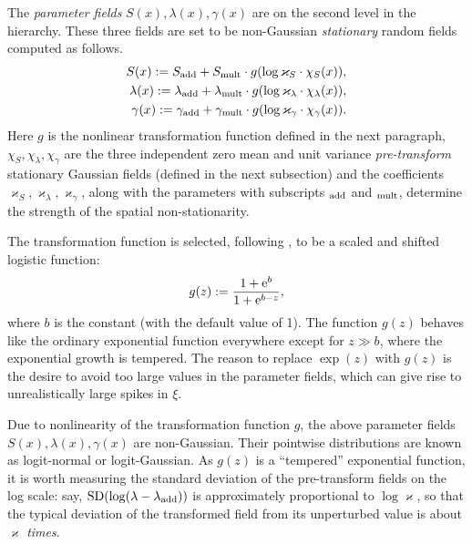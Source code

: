 \documentclass[12pt]{article}
\DeclareMathOperator{\sd}{SD}
\newcommand{\e}{\mathrm{e}}
\begin{document}
The {\em parameter fields}  $S(x),\lambda(x),\gamma(x)$ are on the second level in the hierarchy. 
These three fields are set to be 
non-Gaussian {\em stationary} random fields computed as follows.
%
\begin {equation}
\label{cnx}
\begin{split}
S(x) := {S}_{\rm add} + {S}_{\rm mult}\cdot g(\log\varkappa_S\cdot \chi_S(x)),\\
\lambda(x) := \lambda_{\rm add} + {\lambda}_{\rm mult} \cdot g(\log\varkappa_\lambda\cdot \chi_\lambda(x)),\\
\gamma(x) := \gamma_{\rm add} + \gamma_{\rm mult} \cdot g(\log\varkappa_\gamma\cdot \chi_\gamma(x)).
\end{split}
\end {equation}
%
Here $g$ is the nonlinear transformation function defined in the next paragraph,
$\chi_S,\chi_\lambda,\chi_\gamma$ are the three independent  zero mean and 
unit variance {\em pre-transform} stationary Gaussian fields 
 (defined in the next subsection) and
 the coefficients $\varkappa_S, \varkappa_\lambda, \varkappa_\gamma$, along with the parameters 
with subscripts $_{\rm add}$ and $_{\rm mult}$, determine
the strength of the spatial non-stationarity.

The transformation function is selected, following \citep{DSADM},
to be a  scaled and shifted  logistic function:
%
\begin {equation}
\label{logist}
g(z) :=  \frac {1+\e^\mathnormal{b}} {1+\e^\mathnormal{b-z}},
\end {equation}
%
where $b$ is the constant (with the default value of 1). The function $g(z)$ 
behaves like the ordinary exponential function everywhere except for $z \gg b$,
where the exponential growth  is tempered.
The reason to replace $\exp(z)$ with $g(z)$ is the desire
to avoid too large values in the parameter fields, which can give rise to unrealistically large spikes in $\xi$.

Due to  nonlinearity of the transformation function $g$, the above
parameter fields $S(x),\lambda(x), \gamma(x)$ are non-Gaussian.
Their pointwise distributions are known as logit-normal or logit-Gaussian.
As $g(z)$ 
is a ``tempered'' exponential function, it is worth measuring the standard deviation of
the pre-transform fields
on the log scale: say, $\sd(\log(\lambda - \lambda_{\rm add}))$ is approximately proportional to
$\log\varkappa$, so that the typical deviation of
the transformed field  from its unperturbed value is about $\varkappa$  {\em times}.
\end{document}
